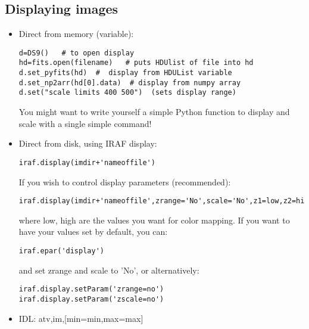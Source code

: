 \documentclass{article}
\begin{document}
\subsection*{Displaying images}
\begin{itemize}
\item Direct from memory (variable):
\begin{verbatim}
d=DS9()   # to open display
hd=fits.open(filename)   # puts HDUlist of file into hd
d.set_pyfits(hd)  #  display from HDUList variable
d.set_np2arr(hd[0].data)  # display from numpy array
d.set("scale limits 400 500")  (sets display range)
\end{verbatim}
You might want to write yourself a simple Python function to display
and scale with a single simple command!
\item Direct from disk, using IRAF display:
\begin{verbatim}
iraf.display(imdir+'nameoffile')
\end{verbatim}
If you wish to control display parameters (recommended):
\begin{verbatim}
iraf.display(imdir+'nameoffile',zrange='No',scale='No',z1=low,z2=high)
\end{verbatim}
where low, high are the values you want for color mapping. If you want
to have your values set by default, you can:
\begin{verbatim}
iraf.epar('display')
\end{verbatim}
and set zrange and scale to 'No', or alternatively:
\begin{verbatim}
iraf.display.setParam('zrange=no')
iraf.display.setParam('zscale=no')
\end{verbatim}
\item IDL: atv,im,[min=min,max=max]
\end{itemize}
\end{document}
